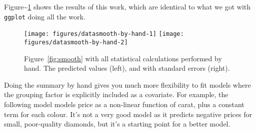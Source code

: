 Figure\textasciitilde{}\ref{fig:smooth-by-hand} shows the results of
this work, which are identical to what we got with \texttt{ggplot} doing
all the work.

\begin{Shaded}
\begin{Highlighting}[]
\StringTok{ }
  \StringTok{ }\StringTok{ } \NormalTok{), } 
  \StringTok{ }\NormalTok{(} \NormalTok{(}\NormalTok{, }\NormalTok{, } \NormalTok{))}
  \StringTok{ } 
  
  \StringTok{ }
  \StringTok{ }
\NormalTok{\}}
\StringTok{ }
  
   \NormalTok{)}
  
   \NormalTok{, } \StringTok{ } \NormalTok{*}\StringTok{ } \StringTok{ } \NormalTok{*}\StringTok{ }
\end{Highlighting}
\end{Shaded}

\begin{figure}

{\centering \texttt{[image: figures/datasmooth-by-hand-1]} \texttt{[image: figures/datasmooth-by-hand-2]} 

}

\caption{Figure~\ref{fig:smooth} with all statistical calculations performed by hand.  The predicted values (left), and with standard errors (right).\label{fig:smooth-by-hand}}
\end{figure}

Doing the summary by hand gives you much more flexibility to fit models
where the grouping factor is explicitly included as a covariate. For
example, the following model models price as a non-linear function of
carat, plus a constant term for each colour. It's not a very good model
as it predicts negative prices for small, poor-quality diamonds, but
it's a starting point for a better model.

